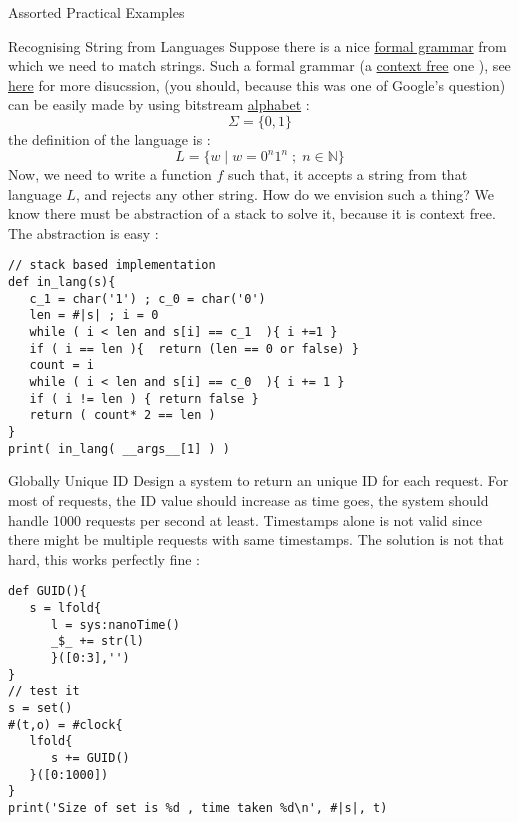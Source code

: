 \begin{section}{Assorted Practical Examples}
\begin{subsection}{Recognising String from Languages}
Suppose there is a nice \href{https://en.wikipedia.org/wiki/Formal\_grammar}{formal grammar} 
from which we need to match strings. Such a formal grammar 
(a \href{https://en.wikipedia.org/wiki/Context-free\_grammar}{context free} one ), see  
\href{http://cs.stackexchange.com/questions/14994/why-does-anbn-fit-the-pumping-lemma-for-context-free-languages}{here}
for more disucssion, (you should, because this was one of Google's question)
can be easily made by using bitstream 
\href{https://en.wikipedia.org/wiki/Formal\_language\#Words\_over\_an\_alphabet}{alphabet} :
$$
\Sigma = \{ 0 , 1 \}
$$
the definition of the language is :
$$
L = \{ w \; | \; w = 0^n 1^n \; ; \; n \in \mathbb{N}  \}
$$
Now, we need to write a function $f$ such that, it accepts a string from that language $L$,
and rejects any other string.
How do we envision such a thing? We know there must be abstraction 
of a stack to solve it, because it is context free. The abstraction is easy :

\begin{center}\begin{minipage}{\linewidth}
\begin{lstlisting}[style=JexlStyle]
// stack based implementation 
def in_lang(s){
   c_1 = char('1') ; c_0 = char('0')
   len = #|s| ; i = 0 
   while ( i < len and s[i] == c_1  ){ i +=1 }
   if ( i == len ){  return (len == 0 or false) }
   count = i   
   while ( i < len and s[i] == c_0  ){ i += 1 }
   if ( i != len ) { return false }
   return ( count* 2 == len )  
}
print( in_lang( __args__[1] ) )
\end{lstlisting}  
\end{minipage}\end{center}

\end{subsection}

\begin{subsection}{Globally Unique ID}
Design a system to return an unique ID for each request. 
For most of requests, the ID value should increase as time goes, 
the system should handle 1000 requests per second at least. 
Timestamps alone is not valid since there might be multiple requests with same timestamps.
The solution is not that hard, this works perfectly fine :

\begin{center}\begin{minipage}{\linewidth}
\begin{lstlisting}[style=JexlStyle]
def GUID(){
   s = lfold{
      l = sys:nanoTime()
      _$_ += str(l)
      }([0:3],'')
}
// test it 
s = set()
#(t,o) = #clock{
   lfold{
      s += GUID()
   }([0:1000])
}
print('Size of set is %d , time taken %d\n', #|s|, t)
\end{lstlisting}  
\end{minipage}\end{center}


\end{subsection}
\end{section}
